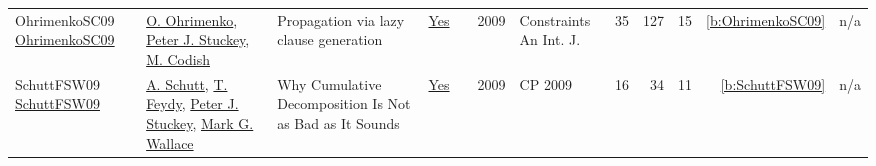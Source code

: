 {\begin{longtable}{>{\raggedright\arraybackslash}p{3cm}>{\raggedright\arraybackslash}p{6cm}>{\raggedright\arraybackslash}p{6.5cm}rrrp{2.5cm}rrrrr}
OhrimenkoSC09 \href{http://dx.doi.org/10.1007/s10601-008-9064-x}{OhrimenkoSC09} & \hyperref[auth:a868]{O. Ohrimenko}, \hyperref[auth:a126]{Peter J. Stuckey}, \hyperref[auth:a869]{M. Codish} & Propagation via lazy clause generation & \href{../works/OhrimenkoSC09.pdf}{Yes} & \cite{OhrimenkoSC09} & 2009 & Constraints An Int. J. & 35 & 127 & 15 & \ref{b:OhrimenkoSC09} & n/a\\
SchuttFSW09 \href{https://doi.org/10.1007/978-3-642-04244-7_58}{SchuttFSW09} & \hyperref[auth:a125]{A. Schutt}, \hyperref[auth:a155]{T. Feydy}, \hyperref[auth:a126]{Peter J. Stuckey}, \hyperref[auth:a117]{Mark G. Wallace} & Why Cumulative Decomposition Is Not as Bad as It Sounds & \href{../works/SchuttFSW09.pdf}{Yes} & \cite{SchuttFSW09} & 2009 & CP 2009 & 16 & 34 & 11 & \ref{b:SchuttFSW09} & n/a\\
\end{longtable}
}

\clearpage
